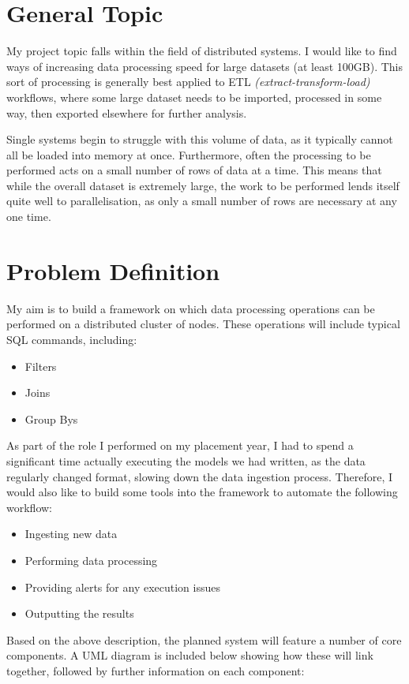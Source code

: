 \documentclass[12pt]{article}
\begin{document}
	\maketitle
	
	\section{General Topic}
	
	My project topic falls within the field of distributed systems. I would like to find ways of increasing data processing speed for large datasets (at least 100GB). This sort of processing is generally best applied to ETL \textit{(extract-transform-load)} workflows, where some large dataset needs to be imported, processed in some way, then exported elsewhere for further analysis. \medskip
	
	Single systems begin to struggle with this volume of data, as it typically cannot all be loaded into memory at once. Furthermore, often the processing to be performed acts on a small number of rows of data at a time. This means that while the overall dataset is extremely large, the work to be performed lends itself quite well to parallelisation, as only a small number of rows are necessary at any one time.
	
	\section{Problem Definition}
	
	My aim is to build a framework on which data processing operations can be performed on a distributed cluster of nodes. These operations will include typical SQL commands, including:
	\begin{itemize}
		\item Filters
		\item Joins
		\item Group Bys
	\end{itemize}

	As part of the role I performed on my placement year, I had to spend a significant time actually executing the models we had written, as the data regularly changed format, slowing down the data ingestion process. Therefore, I would also like to build some tools into the framework to automate the following workflow:
	\begin{itemize}
		\item Ingesting new data
		\item Performing data processing
		\item Providing alerts for any execution issues
		\item Outputting the results
	\end{itemize}
	Based on the above description, the planned system will feature a number of core components. A UML diagram is included below showing how these will link together, followed by further information on each component:
	
\end{document}
